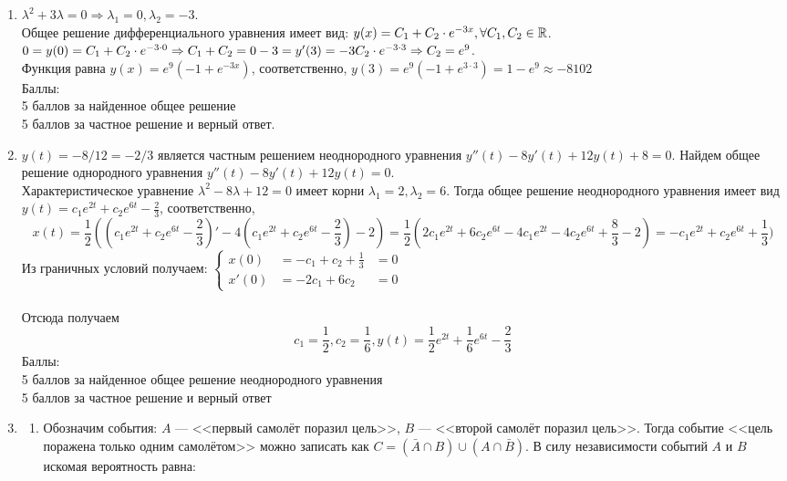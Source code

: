 \documentclass[pdftex,12pt,a4paper]{article}
\begin{document}
\begin{enumerate}
\begin{enumerate}
\end{enumerate}
\item $\lambda^2+3\lambda=0 \Rightarrow \lambda_1=0, \lambda_2=-3.$ \\
Общее решение дифференциального уравнения имеет вид: $y(x)=C_1+C_2\cdot e^{-3x}, \forall C_1,C_2 \in \mathbb R$.\\
$0=y(0)=C_1+C_2\cdot e^{-3\cdot 0} \Rightarrow C_1+C_2=0\\
-3=y'(3)=-3C_2\cdot e^{-3\cdot 3}\Rightarrow C_2=e^9$.\\
 Функция равна $y(x)=e^9(-1+e^{-3x})$, соответственно, $y(3)=e^9(-1+e^{3\cdot3})=1-e^9\approx -8102$\\
Баллы:\\
5 баллов за найденное общее решение\\
5 баллов за частное решение и верный ответ.
\item $y(t)=-8/12=-2/3$ является частным решением неоднородного уравнения $y''(t)-8y'(t)+12y(t)+8=0$. Найдем общее решение однородного уравнения $y''(t)-8y'(t)+12y(t)=0$.\\
Характеристическое уравнение $\lambda^2-8\lambda+12=0$ имеет корни $\lambda_1=2, \lambda_2=6$. Тогда общее решение неоднородного уравнения имеет вид $y(t)=c_1e^{2t}+c_2e^{6t}-\frac{2}{3}$, соответственно,
\begin{equation}
x(t)=\frac{1}{2}\left((c_1e^{2t}+c_2e^{6t}-\frac{2}{3})'-4(c_1e^{2t}+c_2e^{6t}-\frac{2}{3})-2\right)=\frac{1}{2}(2c_1e^{2t}+6c_2e^{6t}-4c_1e^{2t}-4c_2e^{6t}+\frac{8}{3}-2)=-c_1e^{2t}+c_2e^{6t}+\frac{1}{3})
\end{equation}
Из граничных условий получаем: $\left\{\begin{aligned}
x(0) &=-c_1+c_2+\frac{1}{3}&=0\\
x'(0)&=-2c_1+6c_2 &=0
\end{aligned}\right.$\\\\
Отсюда получаем 
\begin{equation}
c_1=\frac{1}{2}, c_2=\frac{1}{6}, y(t)=\frac{1}{2}e^{2t}+\frac{1}{6}e^{6t}-\frac{2}{3}
\end{equation}
Баллы:\\
5 баллов за найденное общее решение неоднородного уравнения\\
5 баллов за частное решение и верный ответ
\item \begin{enumerate}
\item Обозначим события: $A$ --- <<первый самолёт поразил цель>>, $B$ --- <<второй самолёт поразил цель>>. Тогда событие <<цель поражена только одним самолётом>> можно записать как $C=(\bar{A}\cap B)\cup (A\cap \bar{B})$. В силу независимости событий $A$ и $B$ искомая вероятность равна:

\end{enumerate}
\end{enumerate}
\end{document}
